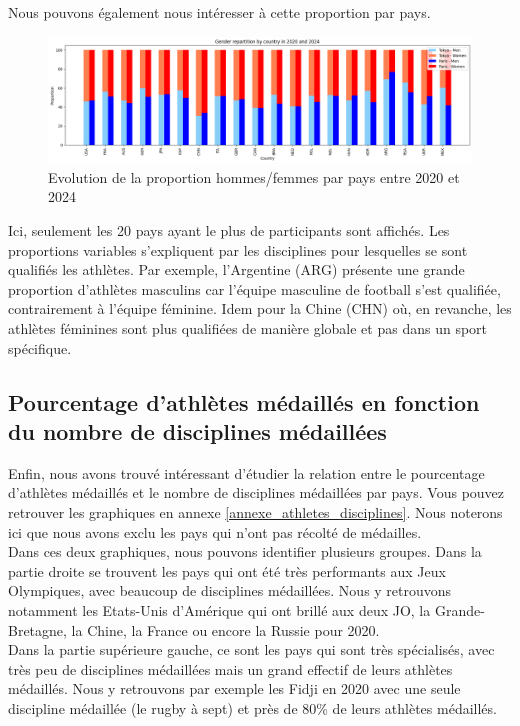 \documentclass{article}
\begin{document}
Nous pouvons également nous intéresser à cette proportion par pays.

\begin{figure}[H]
    \centering
    \includegraphics[width=1\linewidth]{assets/parite_pays.png}
    \caption{Evolution de la proportion hommes/femmes par pays entre 2020 et 2024}
    \label{fig:enter-label}
\end{figure}

Ici, seulement les 20 pays ayant le plus de participants sont affichés. Les proportions variables s'expliquent par les disciplines pour lesquelles se sont qualifiés les athlètes. Par exemple, l'Argentine (ARG) présente une grande proportion d'athlètes masculins car l'équipe masculine de football s'est qualifiée, contrairement à l'équipe féminine. Idem pour la Chine (CHN) où, en revanche, les athlètes féminines sont plus qualifiées de manière globale et pas dans un sport spécifique.

\subsection{Pourcentage d'athlètes médaillés en fonction du nombre de disciplines médaillées}

Enfin, nous avons trouvé intéressant d'étudier la relation entre le pourcentage d'athlètes médaillés et le nombre de disciplines médaillées par pays. Vous pouvez retrouver les graphiques en annexe \ref{annexe_athletes_disciplines}. Nous noterons ici que nous avons exclu les pays qui n'ont pas récolté de médailles.
\\

Dans ces deux graphiques, nous pouvons identifier plusieurs groupes. Dans la partie droite se trouvent les pays qui ont été très performants aux Jeux Olympiques, avec beaucoup de disciplines médaillées. Nous y retrouvons notamment les Etats-Unis d'Amérique qui ont brillé aux deux JO, la Grande-Bretagne, la Chine, la France ou encore la Russie pour 2020.
\\

Dans la partie supérieure gauche, ce sont les pays qui sont très spécialisés, avec très peu de disciplines médaillées mais un grand effectif de leurs athlètes médaillés. Nous y retrouvons par exemple les Fidji en 2020 avec une seule discipline médaillée (le rugby à sept) et près de 80\% de leurs athlètes médaillés.
\\
\end{document}
